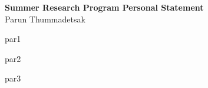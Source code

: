 \documentclass[11pt]{article}
\begin{document}
\begin{center}
  {\Large\textbf{Summer Research Program Personal Statement}}\\[4pt]
  Parun Thummadetsak
\end{center}

\vspace{1em}

par1

par2

par3
\end{document}
